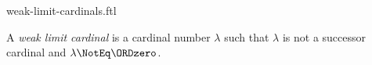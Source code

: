 \documentclass{stex}
\begin{document}
\begin{smodule}{weak-limit-cardinals.ftl}

\begin{definition}[forthel,for=weak limit cardinal]
  A \emph{weak limit cardinal} is a cardinal number $\lambda$ such that $\lambda$ is not a successor cardinal and $\lambda \NotEq \ORDzero$.
\end{definition}
\end{smodule}
\end{document}
